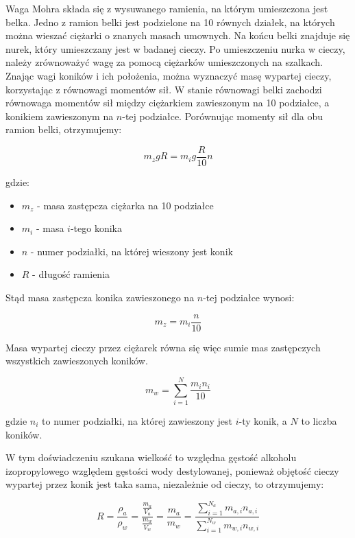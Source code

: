 \documentclass[a4paper,12pt]{article}
\begin{document}
Waga Mohra składa się z wysuwanego ramienia, na którym umieszczona jest belka. Jedno z ramion belki jest podzielone na 10 równych działek, na których można wieszać ciężarki o znanych masach umownych. Na końcu belki znajduje się nurek, który umieszczany jest w badanej cieczy. Po umieszczeniu nurka w cieczy, należy zrównoważyć wagę za pomocą ciężarków umieszczonych na szalkach. Znając wagi koników i ich położenia, można wyznaczyć masę wypartej cieczy, korzystając z równowagi momentów sił.
W stanie równowagi belki zachodzi równowaga momentów sił między ciężarkiem zawieszonym na 10 podziałce, a konikiem zawieszonym na $n$-tej podziałce. Porównując momenty sił dla obu ramion belki, otrzymujemy:

\begin{equation*}
    m_z gR = m_i g \frac{R}{10} n
\end{equation*}

gdzie:
\begin{itemize}
    \item $m_z$ - masa zastępcza ciężarka na 10 podziałce
    \item $m_i$ - masa $i$-tego konika
    \item $n$ - numer podziałki, na której wieszony jest konik
    \item $R$ - długość ramienia
\end{itemize}

Stąd masa zastępcza konika zawieszonego na $n$-tej podziałce wynosi:

\begin{equation*}
    m_z = m_i \frac{n}{10}
\end{equation*}

Masa wypartej cieczy przez ciężarek równa się więc sumie mas zastępczych wszystkich zawieszonych koników.

\begin{equation}
    \label{eq:waga_mohra}
    m_w = \sum_{i=1}^{N} \frac{m_i n_i}{10}
\end{equation}

gdzie $n_i$ to numer podziałki, na której zawieszony jest $i$-ty konik, a $N$ to liczba koników.


W tym doświadczeniu szukana wielkość to względna gęstość alkoholu izopropylowego względem gęstości wody destylowanej, ponieważ objętość cieczy wypartej przez konik jest taka sama, niezależnie od cieczy, to otrzymujemy:

\begin{equation}
    \label{eq:wzgledna_gestosc}
    R = \frac{\rho_a}{\rho_w} = \frac{\frac{m_a}{V_a}}{\frac{m_w}{V_w}} = \frac{m_a}{m_w} = \frac{\sum_{i=1}^{N_a} m_{a,i} n_{a,i}}{\sum_{i=1}^{N_w} m_{w,i} n_{w,i}}
\end{equation}
\end{document}
